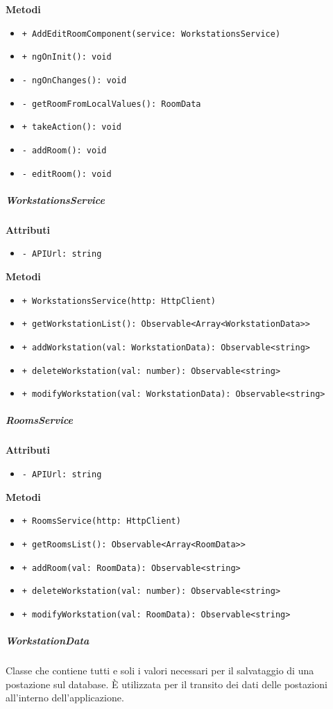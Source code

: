 \textbf{Metodi}
\begin{itemize}
	\item \texttt{+ AddEditRoomComponent(service: WorkstationsService) 	}
	\item \texttt{+ ngOnInit(): void 	}
	\item \texttt{- ngOnChanges(): void 	}
	\item \texttt{- getRoomFromLocalValues(): RoomData 	}
	\item \texttt{+ takeAction(): void 	}
	\item \texttt{- addRoom(): void 	}
	\item \texttt{- editRoom(): void}
\end{itemize}
\subparagraph{WorkstationsService}
\textbf{Attributi}
\begin{itemize}
	\item \texttt{- APIUrl: string}
\end{itemize}
\textbf{Metodi}
\begin{itemize}
	\item \texttt{+ WorkstationsService(http: HttpClient) 	}
	\item \texttt{+ getWorkstationList(): Observable<Array<WorkstationData>> 	}
	\item \texttt{+ addWorkstation(val: WorkstationData): Observable<string> 	}
	\item \texttt{+ deleteWorkstation(val: number): Observable<string> 	}
	\item \texttt{+ modifyWorkstation(val: WorkstationData): Observable<string>}
\end{itemize}
\subparagraph{RoomsService}
\textbf{Attributi}
\begin{itemize}
	\item \texttt{- APIUrl: string}
\end{itemize}
\textbf{Metodi}
\begin{itemize}
	\item \texttt{+ RoomsService(http: HttpClient) 	}
	\item \texttt{+ getRoomsList(): Observable<Array<RoomData>> 	}
	\item \texttt{+ addRoom(val: RoomData): Observable<string> 	}
	\item \texttt{+ deleteWorkstation(val: number): Observable<string> 	}
	\item \texttt{+ modifyWorkstation(val: RoomData): Observable<string>}
\end{itemize}
\subparagraph{WorkstationData}
Classe che contiene tutti e soli i valori necessari per il salvataggio di una postazione sul database. È utilizzata per il transito dei dati delle postazioni all'interno dell'applicazione.
